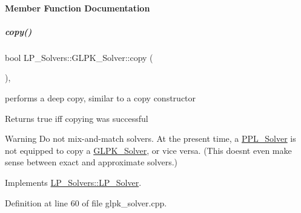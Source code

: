 \paragraph{Member Function Documentation}
\mbox{\label{group___c_l_s_solvers_a43a745172366a1dfd893dee00f0ce0fb}} 
\subparagraph{\texorpdfstring{copy()}{copy()}}
{\footnotesize\ttfamily bool L\+P\+\_\+\+Solvers\+::\+G\+L\+P\+K\+\_\+\+Solver\+::copy (\begin{DoxyParamCaption}\item[{const \hyperlink{group___c_l_s_solvers_class_l_p___solvers_1_1_l_p___solver}{L\+P\+\_\+\+Solver} $\ast$}]{ }\end{DoxyParamCaption})\hspace{0.3cm}{\ttfamily [override]}, {\ttfamily [virtual]}}



performs a deep copy, similar to a copy constructor 

\begin{DoxyReturn}{Returns}
{\ttfamily true} iff copying was successful 
\end{DoxyReturn}
\begin{DoxyWarning}{Warning}
Do not mix-\/and-\/match solvers. At the present time, a \hyperlink{group___c_l_s_solvers_class_l_p___solvers_1_1_p_p_l___solver}{P\+P\+L\+\_\+\+Solver} is not equipped to copy a \hyperlink{group___c_l_s_solvers_class_l_p___solvers_1_1_g_l_p_k___solver}{G\+L\+P\+K\+\_\+\+Solver}, or vice versa. (This doesn\textquotesingle{}t even make sense between exact and approximate solvers.) 
\end{DoxyWarning}


Implements \hyperlink{group___c_l_s_solvers_a36c14a88e9d3ae9d9321acc7877236d0}{L\+P\+\_\+\+Solvers\+::\+L\+P\+\_\+\+Solver}.



Definition at line 60 of file glpk\+\_\+solver.\+cpp.

